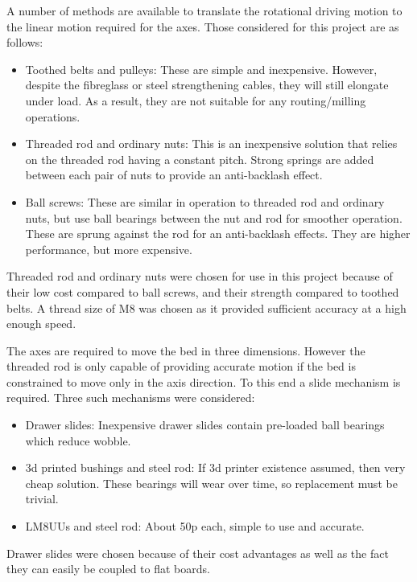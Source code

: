 A number of methods are available to translate the rotational driving
 motion to the linear motion required for the axes. Those
considered for this project are as follows:

\begin{itemize}
	\item	Toothed belts and pulleys: These are simple and inexpensive. However, despite the fibreglass or steel strengthening cables, they will
			still elongate under load. As a result, they are not suitable for any routing/milling operations.
	\item	Threaded rod and ordinary nuts: This is an inexpensive solution that relies on the threaded rod having a constant pitch. Strong springs 
			are added between each pair of nuts to provide an anti-backlash effect.
	\item	Ball screws: These are similar in operation to threaded rod and ordinary nuts, but use ball bearings between the nut and rod for smoother
			operation. These are sprung against the rod for an anti-backlash effects. They are higher performance, but more expensive.
\end{itemize}
Threaded rod and ordinary nuts were chosen for use in this project because
of their low cost compared to ball screws, and their strength compared
to toothed belts. A thread size of M8 was chosen as it provided sufficient
accuracy at a high enough speed.

The axes are required to move the bed in three dimensions. However the 
threaded rod is only capable of providing accurate motion if the bed
is constrained to move only in the axis direction. To this end a slide
mechanism is required. Three such mechanisms were considered:

\begin{itemize}
	\item	Drawer slides: Inexpensive drawer slides contain pre-loaded ball bearings which reduce wobble.
	\item	3d printed bushings and steel rod: If 3d printer existence assumed, then very cheap solution. These bearings
			will wear over time, so replacement must be trivial.
	\item	LM8UUs and steel rod: About 50p each, simple to use and accurate.
\end{itemize}

Drawer slides were chosen because of their cost advantages as well as the fact
they can easily be coupled to flat boards.


